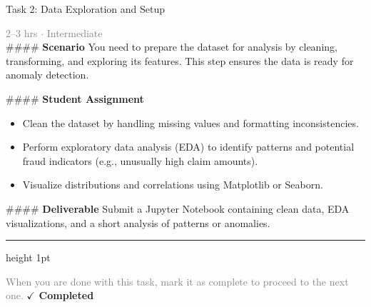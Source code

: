 \documentclass[10pt,a4paper]{article}
\begin{document}
\begin{taskbox}{Task 2: Data Exploration and Setup}

    {\small \textcolor{gray}{2--3 hrs $\cdot$ Intermediate}}\\[12pt]

    \#\#\#\# \textbf{Scenario}  
You need to prepare the dataset for analysis by cleaning, transforming, and exploring its features. This step ensures the data is ready for anomaly detection.  

\#\#\#\# \textbf{Student Assignment}  
\begin{itemize}
    \item Clean the dataset by handling missing values and formatting inconsistencies.  
    \item Perform exploratory data analysis (EDA) to identify patterns and potential fraud indicators (e.g., unusually high claim amounts).  
    \item Visualize distributions and correlations using Matplotlib or Seaborn.  
\end{itemize}

\#\#\#\# \textbf{Deliverable}  
Submit a Jupyter Notebook containing clean data, EDA visualizations, and a short analysis of patterns or anomalies.\par

    \vspace{16pt}

    \textcolor{cardBorder}{\hrule height 1pt}\vspace{8pt}

    \small \textcolor{gray}{When you are done with this task, mark it as complete to proceed to the next one.} \hfill \textbf{\textcolor{brandDark}{$\checkmark$ Completed}}

\end{taskbox}
\end{document}
